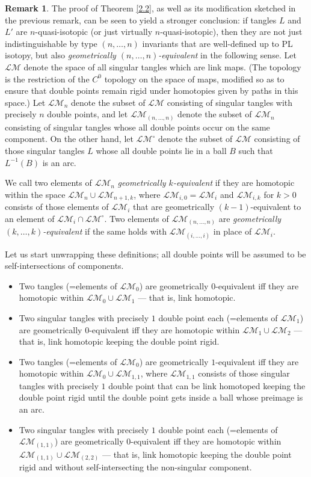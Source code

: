 \documentclass[a4paper,12pt,reqno,oneside]{amsart} %
\theoremstyle{plain}
\theoremstyle{definition}
\newtheorem{remark}[theorem]{Remark}
\theoremstyle{named}
\renewcommand{\:}{\colon}
\def\LM{\mathcal{LM}}
\begin{document}
\begin{remark} The proof of Theorem \ref{2.2}, as well as its modification sketched in the previous remark, can be seen
to yield a stronger conclusion: if tangles $L$ and $L'$ are $n$-quasi-isotopic (or just virtually $n$-quasi-isotopic), then
they are not just indistinguishable by type $(n,\dots,n)$ invariants that are well-defined up to PL isotopy, but also
{\it geometrically $(n,\dots,n)$-equivalent} in the following sense.
Let $\LM$ denote the space of all singular tangles which are link maps.
(The topology is the restriction of the $C^0$ topology on the space of maps, modified so as to ensure that double points
remain rigid under homotopies given by paths in this space.)
Let $\LM_n$ denote the subset of $\LM$ consisting of singular tangles with precisely $n$ double points, and let
$\LM_{(n,\dots,n)}$ denote the subset of $\LM_n$ consisting of singular tangles whose all double points occur on the same component.
On the other hand, let $\LM^\circ$ denote the subset of $\LM$ consisting of those singular tangles $L$ whose all double points lie in 
a ball $B$ such that $L^{-1}(B)$ is an arc.

We call two elements of $\LM_n$ {\it geometrically $k$-equivalent} if they are homotopic within the space $\LM_n\cup\LM_{n+1,k}$, 
where $\LM_{i,0}=\LM_i$ and $\LM_{i,k}$ for $k>0$ consists of those elements of $\LM_i$ that are geometrically 
$(k-1)$-equivalent to an element of $\LM_i\cap\LM^\circ$.
Two elements of $\LM_{(n,\dots,n)}$ are {\it geometrically $(k,\dots,k)$-equivalent} if the same holds with $\LM_{(i,\dots,i)}$ 
in place of $\LM_i$.

Let us start unwrapping these definitions; all double points will be assumed to be self-intersections of components.
\begin{itemize}
\item[0/0] Two tangles (=elements of $\LM_0$) are geometrically $0$-equivalent iff they are homotopic within $\LM_0\cup\LM_1$ --- that is, link homotopic.
\item[1/0] Two singular tangles with precisely $1$ double point each (=elements of $\LM_1$) are geometrically $0$-equivalent iff they are homotopic 
within $\LM_1\cup\LM_2$ --- that is, link homotopic keeping the double point rigid.
\item[0/1] Two tangles (=elements of $\LM_0$) are geometrically $1$-equivalent iff they are homotopic within $\LM_0\cup\LM_{1,1}$, where $\LM_{1,1}$ 
consists of those singular tangles with precisely $1$ double point that can be link homotoped keeping the double point rigid until the double point
gets inside a ball whose preimage is an arc.
\item[(1,1)/0] Two singular tangles with precisely $1$ double point each (=elements of $\LM_{(1,1)}$) are geometrically $0$-equivalent iff they 
are homotopic within $\LM_{(1,1)}\cup\LM_{(2,2)}$ --- that is, link homotopic keeping the double point rigid and without self-intersecting 
the non-singular component.
\end{itemize}


\end{remark}
\end{document}
